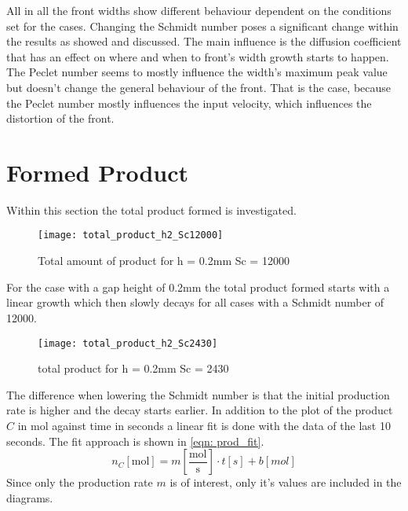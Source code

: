 \documentclass[../thesis.tex]{subfiles}
\begin{document}
All in all the front widths show different behaviour dependent on the conditions set for the cases. Changing the Schmidt number poses a significant change within the results as showed and discussed. The main influence is the diffusion coefficient that has an effect on where and when to front's width growth starts to happen. The Peclet number seems to mostly influence the width's maximum peak value but doesn't change the general behaviour of the front. That is the case, because the Peclet number mostly influences the input velocity, which influences the distortion of the front.

\section{Formed Product}

Within this section the total product formed is investigated. 

\begin{figure}[htb]
	\centering
	\texttt{[image: total\_product\_h2\_Sc12000]}
	\caption{Total amount of product for h = 0.2mm Sc = 12000}
	\label{fig: total_prod_h2_Sc12000}
\end{figure}
For the case with a gap height of 0.2mm the total product formed starts with a linear growth which then slowly decays for all cases with a Schmidt number of 12000.
\begin{figure}[htb]
	\centering
	\texttt{[image: total\_product\_h2\_Sc2430]}
	\caption{total product for  h = 0.2mm Sc = 2430}
	\label{fig: total_prod_h2_Sc2430}
\end{figure}
The difference when lowering the Schmidt number is that the initial production rate is higher and the decay starts earlier. In addition to the plot of the product $C$ in mol against time in seconds a linear fit is done with the data of the last 10 seconds. The fit approach is shown in \autoref{eqn: prod_fit}.
\begin{equation}
	\label{eqn: prod_fit}
	n_C \left[ \text{mol} \right] = m \left[\frac{\text{mol}}{\text{s}}\right] \cdot t \left[s\right] + b \left[mol\right]
\end{equation}
Since only the production rate $m$ is of interest, only it's values are included in the diagrams.
\end{document}
